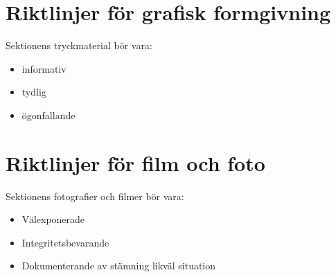 \documentclass[]{dsekprotokoll}
\begin{document}
\section{Riktlinjer för grafisk formgivning}
Sektionens tryckmaterial bör vara:
\begin{itemize}
    \item informativ
    \item tydlig
    \item ögonfallande
\end{itemize}

\section{Riktlinjer för film och foto}
Sektionens fotografier och filmer bör vara:
\begin{itemize}
    \item Välexponerade
    \item Integritetsbevarande
    \item Dokumenterande av stämning likväl situation
\end{itemize}



\end{document}
